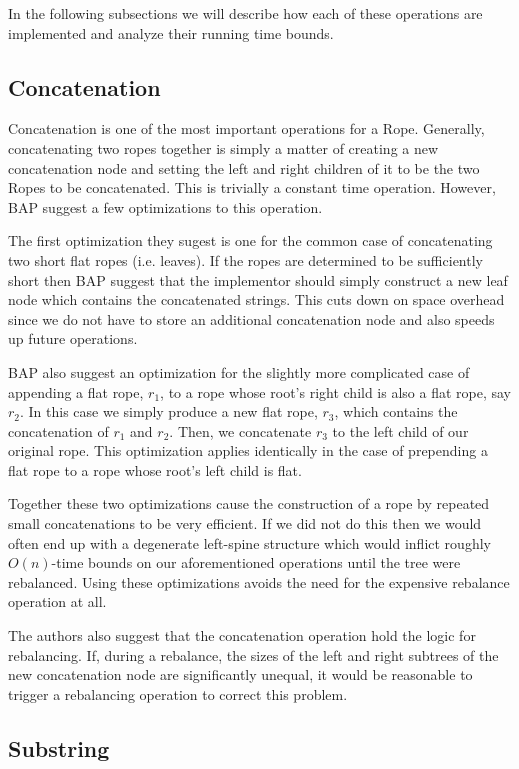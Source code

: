 \documentclass[12pt]{article}
\begin{document}
In the following subsections we will describe how each of these operations are implemented and analyze their running time bounds.

\subsection{Concatenation}

Concatenation is one of the most important operations for a Rope. Generally, concatenating two ropes together is simply a matter of creating a new concatenation node and setting the left and right children of it to be the two Ropes to be concatenated. This is trivially a constant time operation. However, BAP suggest a few optimizations to this operation.

The first optimization they sugest is one for the common case of concatenating two short flat ropes (i.e. leaves). If the ropes are determined to be sufficiently short then BAP suggest that the implementor should simply construct a new leaf node which contains the concatenated strings. This cuts down on space overhead since we do not have to store an additional concatenation node and also speeds up future operations.

BAP also suggest an optimization for the slightly more complicated case of appending a flat rope, $r_1$, to a rope whose root's right child is also a flat rope, say $r_2$. In this case we simply produce a new flat rope, $r_3$, which contains the concatenation of $r_1$ and $r_2$. Then, we concatenate $r_3$ to the left child of our original rope. This optimization applies identically in the case of prepending a flat rope to a rope whose root's left child is flat.

Together these two optimizations cause the construction of a rope by repeated small concatenations to be very efficient. If we did not do this then we would often end up with a degenerate left-spine structure which would inflict roughly $O(n)$-time bounds on our aforementioned operations until the tree were rebalanced. Using these optimizations avoids the need for the expensive rebalance operation at all.

The authors also suggest that the concatenation operation hold the logic for rebalancing. If, during a rebalance, the sizes of the left and right subtrees of the new concatenation node are significantly unequal, it would be reasonable to trigger a rebalancing operation to correct this problem. 


\subsection{Substring}
\end{document}
